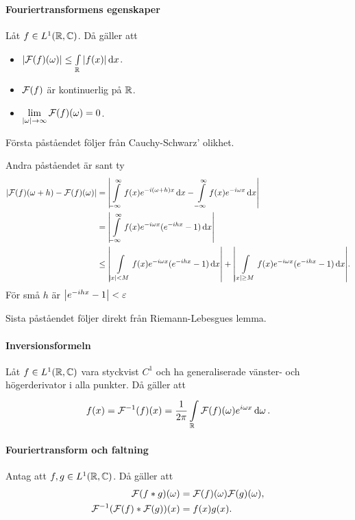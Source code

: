 \paragraph{Fouriertransformens egenskaper}
Låt $f\in L^{1}(\mathbb{R}, \mathbb{C})$. Då gäller att
\begin{itemize}
	\item $\abs{\mathcal{F}(f)(\omega)} \leq \int\limits_{\mathbb{R}}^{}\abs{f(x)}\dd{x}$.
	\item $\mathcal{F}(f)$ är kontinuerlig på $\mathbb{R}$.
	\item $\lim\limits_{\abs{\omega}\to\infty}\mathcal{F}(f)(\omega) = 0$.
\end{itemize}

\proof
Första påståendet följer från Cauchy-Schwarz' olikhet.

Andra påståendet är sant ty
\begin{align*}
	\abs{\mathcal{F}(f)(\omega + h) - \mathcal{F}(f)(\omega)} &= \abs{\int\limits_{-\infty}^{\infty}f(x)e^{-i(\omega + h)x}\dd{x} - \int\limits_{-\infty}^{\infty}f(x)e^{-i\omega x}\dd{x}} \\
	                                            &= \abs{\int\limits_{-\infty}^{\infty}f(x)e^{-i\omega x}(e^{-ihx} - 1)\dd{x}} \\
	                                            &\leq \abs{\int\limits_{\abs{x} < M}^{}f(x)e^{-i\omega x}(e^{-ihx} - 1)\dd{x}} + \abs{\int\limits_{\abs{x} \geq M}^{}f(x)e^{-i\omega x}(e^{-ihx} - 1)\dd{x}}.
\end{align*}
För små $h$ är $\abs{e^{-ihx} - 1} < \varepsilon$

Sista påståendet följer direkt från Riemann-Lebesgues lemma.

\paragraph{Inversionsformeln}
Låt $f\in L^{1}(\mathbb{R}, \mathbb{C})$ vara styckvist $C^{1}$ och ha generaliserade vänster- och högerderivator i alla punkter. Då gäller att
\begin{align*}
	f(x) = \mathcal{F}^{-1}(f)(x) = \frac{1}{2\pi}\int\limits_{\mathbb{R}}^{}\mathcal{F}(f)(\omega)e^{i\omega x}\dd{\omega}.
\end{align*}

\proof

\paragraph{Fouriertransform och faltning}
Antag att $f, g\in L^{1}(\mathbb{R}, \mathbb{C})$. Då gäller att
\begin{align*}
	\mathcal{F}(f * g)(\omega)           &= \mathcal{F}(f)(\omega)\mathcal{F}(g)(\omega), \\
	\mathcal{F}^{-1}(\mathcal{F}(f) * \mathcal{F}(g))(x) &= f(x)g(x).
\end{align*}

